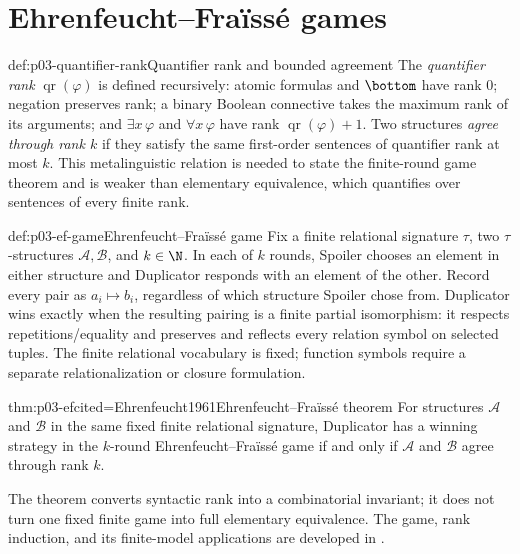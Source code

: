 \section{Ehrenfeucht--Fra\"iss\'e games}
\label{sec:p03-ef-games}

\begin{hbdefinition}{def:p03-quantifier-rank}{Quantifier rank and bounded agreement}
The \emph{quantifier rank} \(\operatorname{qr}(\varphi)\) is defined
recursively: atomic formulas and \(\bottom\) have rank \(0\); negation preserves rank; a
binary Boolean connective takes the maximum rank of its arguments; and
\(\exists x\,\varphi\) and \(\forall x\,\varphi\) have rank
\(\operatorname{qr}(\varphi)+1\).  Two structures \emph{agree through rank
\(k\)} if they satisfy the same first-order sentences of quantifier rank at
most \(k\).  This metalinguistic relation is needed to state the finite-round
game theorem and is weaker than elementary equivalence, which quantifies over
sentences of every finite rank.
\end{hbdefinition}

\begin{hbdefinition}{def:p03-ef-game}{Ehrenfeucht--Fra\"iss\'e game}
Fix a finite relational signature \(\tau\), two \(\tau\)-structures
\(\mathcal A,\mathcal B\), and \(k\in\N\).  In each of \(k\) rounds,
Spoiler chooses an element in either structure and Duplicator responds with an
element of the other.  Record every pair as \(a_i\mapsto b_i\), regardless of
which structure Spoiler chose from.  Duplicator wins exactly when the resulting
pairing is a finite partial isomorphism: it respects repetitions/equality and
preserves and reflects every relation symbol on selected tuples.  The finite
relational vocabulary is fixed; function symbols require a separate
relationalization or closure formulation.
\end{hbdefinition}

\begin{hbtheorem}{thm:p03-ef}{cited=Ehrenfeucht1961}{Ehrenfeucht--Fra\"iss\'e theorem}
For structures \(\mathcal A\) and \(\mathcal B\) in the same fixed finite
relational signature, Duplicator has a winning strategy in the \(k\)-round
Ehrenfeucht--Fra\"iss\'e game if and only if \(\mathcal A\) and
\(\mathcal B\) agree through rank \(k\).
\end{hbtheorem}

The theorem converts syntactic rank into a combinatorial invariant; it does
not turn one fixed finite game into full elementary equivalence.  The game,
rank induction, and its finite-model applications are developed in
\cite{Ehrenfeucht1961,Libkin2004}.


